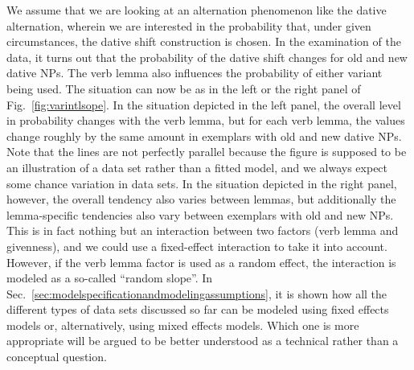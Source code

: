 We assume that we are looking at an alternation phenomenon like the dative alternation, wherein we are interested in the probability that, under given circumstances, the dative shift construction is chosen.
In the examination of the data, it turns out that the probability of the dative shift changes for old and new dative NPs.
The verb lemma also influences the probability of either variant being used.
The situation can now be as in the left or the right panel of Fig.~\ref{fig:varintlsope}.
In the situation depicted in the left panel, the overall level in probability changes with the verb lemma, but for each verb lemma, the values change roughly by the same amount in exemplars with old and new dative NPs.
Note that the lines are not perfectly parallel because the figure is supposed to be an illustration of a data set rather than a fitted model, and we always expect some chance variation in data sets.
In the situation depicted in the right panel, however, the overall tendency also varies between lemmas, but additionally the lemma-specific tendencies also vary between exemplars with old and new NPs.
This is in fact nothing but an interaction between two factors (verb lemma and givenness), and we could use a fixed-effect interaction to take it into account.
However, if the verb lemma factor is used as a random effect, the interaction is modeled as a so-called ``random slope''.
In Sec.~\ref{sec:modelspecificationandmodelingassumptions}, it is shown how all the different types of data sets discussed so far can be modeled using fixed effects models or, alternatively, using mixed effects models.
Which one is more appropriate will be argued to be better understood as a technical rather than a conceptual question.

